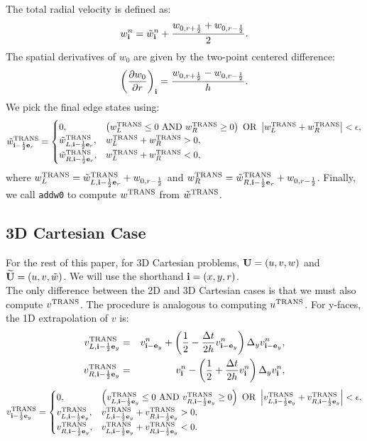 \documentclass[11pt]{article}
\def\half  {\frac{1}{2}}
\def\dt    {\Delta t}
\def\trans {\rm TRANS}
\def\eb    {{\bf e}}
\def\ib    {{\bf i}}
\def\Ub    {{\bf U}}
\def\Ubt   {\widetilde{\bf U}}
\def\wt    {\tilde{w}}
\begin{document}
The total radial velocity is defined as:
\begin{equation}
w_{\ib}^n = \wt_{\ib}^n + \frac{w_{0,r+\half}+w_{0,r-\half}}{2}.\label{Total Radial Velocity}
\end{equation}
The spatial derivatives of $w_0$ are given by the two-point centered difference:
\begin{equation}
\left(\frac{\partial w_0}{\partial r}\right)_{\ib} = \frac{w_{0,r+\half}-w_{0,r-\half}}{h}.\label{Radial Derivative of w_0}
\end{equation}
We pick the final edge states using:
\begin{equation}
\wt^{\trans}_{\ib-\half\eb_r} =
\begin{cases}
0, & \left(w_L^{\trans} \le 0 ~ {\rm AND} ~ w_R^{\trans} \ge 0\right) ~ {\rm OR} ~ \left|w_L^{\trans} + w_R^{\trans}\right| < \epsilon, \\
\wt_{L,\ib-\half\eb_r}^{\trans}, & w_L^{\trans} + w_R^{\trans} > 0, \\
\wt_{R,\ib-\half\eb_r}^{\trans}, & w_L^{\trans} + w_R^{\trans} < 0, \\
\end{cases}
\end{equation}
where $w_L^{\trans} = \wt_{L,\ib-\half\eb_r}^{\trans} + w_{0,r-\half}$ and $w_R^{\trans} = \wt_{R,\ib-\half\eb_r}^{\trans} + w_{0,r-\half}$.  Finally, we call {\tt addw0} to compute $w^{\trans}$ from $\wt^{\trans}$.
\subsection{3D Cartesian Case}
For the rest of this paper, for 3D Cartesian problems, $\Ub = (u,v,w)$ and $\Ubt = (u,v,\wt)$.  We will use the shorthand $\ib = (x,y,r)$.\\

The only difference between the 2D and 3D Cartesian cases is that we must also compute $v^{\trans}$.  The procedure is analogous to computing $u^{\trans}$.  For y-faces, the 1D extrapolation of $v$ is:
\begin{eqnarray}
v_{L,\ib-\half\eb_y}^{\trans} &=& v_{\ib-\eb_y}^n + \left(\half - \frac{\dt}{2h}v_{\ib-\eb_y}^n\right)\Delta_y v_{\ib-\eb_y}^n, \\
v_{R,\ib-\half\eb_y}^{\trans} &=& v_{\ib}^n - \left(\half + \frac{\dt}{2h}v_{\ib}^n\right)\Delta_y v_{\ib}^n,
\end{eqnarray}
\begin{equation}
v^{\trans}_{\ib-\half\eb_y} =
\begin{cases}
0, & \left(v_{L,\ib-\half\eb_y}^{\trans} \le 0 ~ {\rm AND} ~ v_{R,\ib-\half\eb_y}^{\trans} \ge 0\right) ~ {\rm OR} ~ \left|v_{L,\ib-\half\eb_y}^{\trans} + v_{R,\ib-\half\eb_y}^{\trans}\right| < \epsilon, \\
v_{L,\ib-\half\eb_y}^{\trans}, & v_{L,\ib-\half\eb_y}^{\trans} + v_{R,\ib-\half\eb_y}^{\trans} > 0, \\
v_{R,\ib-\half\eb_y}^{\trans}, & v_{L,\ib-\half\eb_y}^{\trans} + v_{R,\ib-\half\eb_y}^{\trans} < 0. \\
\end{cases}
\end{equation}
\end{document}
